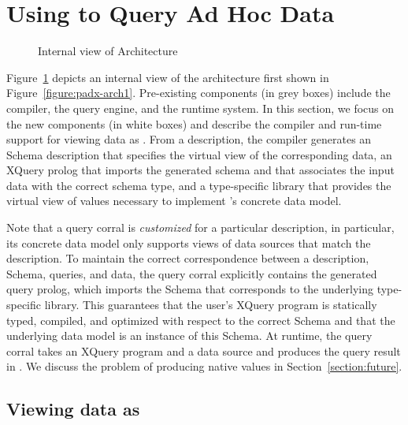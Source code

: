 \section{Using \padx{} to Query Ad Hoc Data}
\label{section:padx}

\begin{figure}
\begin{center}
\end{center}
\caption{Internal view of \padx{} Architecture}
\label{figure:padx-arch}
\end{figure}

Figure~\ref{figure:padx-arch} depicts an internal view of the \padx{}
architecture first shown in Figure~\ref{figure:padx-arch1}.
Pre-existing components (in grey boxes) include the \pads{} compiler,
the \Galax{} query engine, and the \pads{} runtime system.  In this
section, we focus on the new components (in white boxes) and describe
the compiler and run-time support for viewing \pads{} data as \Xml{}.
From a \pads{} description, the compiler generates an \Xml{} Schema
description that specifies the virtual \Xml{} view of the corresponding
\pads{} data, an XQuery prolog that imports the generated schema and
that associates the input data with the correct schema type, and a
type-specific library that provides the virtual \Xml{} view of \pads{}
values necessary to implement \padx{}'s concrete data model.  

Note that a query corral is \emph{customized} for a particular \pads{}
description, in particular, its concrete data model only supports
views of data sources that match the \pads{} description.  To maintain
the correct correspondence between a description, \Xml{} Schema, queries,
and data, the query corral explicitly contains the generated query
prolog, which imports the \Xml{} Schema that corresponds to the
underlying type-specific library.  This guarantees that the user's
XQuery program is statically typed, compiled, and optimized with
respect to the correct \Xml{} Schema and that the underlying data model
is an instance of this \Xml{} Schema.  At runtime, the query corral takes
an XQuery program and a \pads{} data source and produces the query
result in \Xml{}.  We discuss the problem of producing native \pads{}
values in Section~\ref{section:future}.

\subsection{Viewing \pads{} data as \Xml{}}	
\label{subsec:xmlview}

